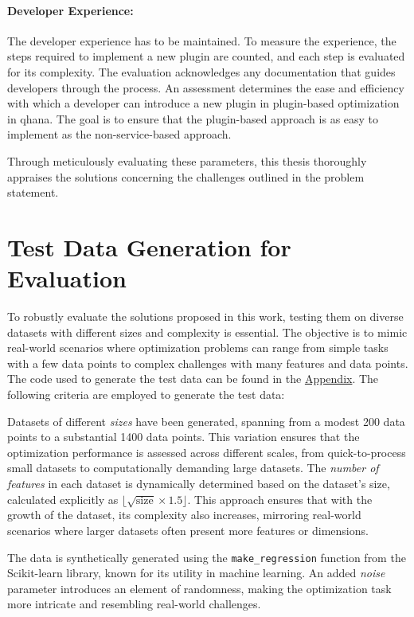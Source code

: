 \documentclass[
  a4paper,  %
  twoside,  %
  bibliography=totoc,
  headsepline,
  cleardoublepage=empty,
  parskip=half,
  draft=false
]{scrbook}
\begin{document}
\paragraph{Developer Experience:}
The developer experience has to be maintained.
To measure the experience, the steps required to implement a new plugin are counted, and each step is evaluated for its complexity.
The evaluation acknowledges any documentation that guides developers through the process.
An assessment determines the ease and efficiency with which a developer can introduce a new plugin in plugin-based optimization in \gls{qhana}.
The goal is to ensure that the plugin-based approach is as easy to implement as the non-service-based approach.

Through meticulously evaluating these parameters, this thesis thoroughly appraises the solutions concerning the challenges outlined in the problem statement.

\section{Test Data Generation for Evaluation}
To robustly evaluate the solutions proposed in this work, testing them on diverse datasets with different sizes and complexity is essential.
The objective is to mimic real-world scenarios where optimization problems can range from simple tasks with a few data points to complex challenges with many features and data points.
The code used to generate the test data can be found in the \hyperref[chap:appendix]{Appendix}.
The following criteria are employed to generate the test data:

Datasets of different \emph{sizes} have been generated, spanning from a modest 200 data points to a substantial 1400 data points.
This variation ensures that the optimization performance is assessed across different scales, from quick-to-process small datasets to computationally demanding large datasets.
The \emph{number of features} in each dataset is dynamically determined based on the dataset's size, calculated explicitly as \(\lfloor \sqrt{\text{size}} \times 1.5 \rfloor\).
This approach ensures that with the growth of the dataset, its complexity also increases, mirroring real-world scenarios where larger datasets often present more features or dimensions.

The data is synthetically generated using the \texttt{make\_regression} function from the Scikit-learn library, known for its utility in machine learning.
An added \emph{noise} parameter introduces an element of randomness, making the optimization task more intricate and resembling real-world challenges.
\end{document}
